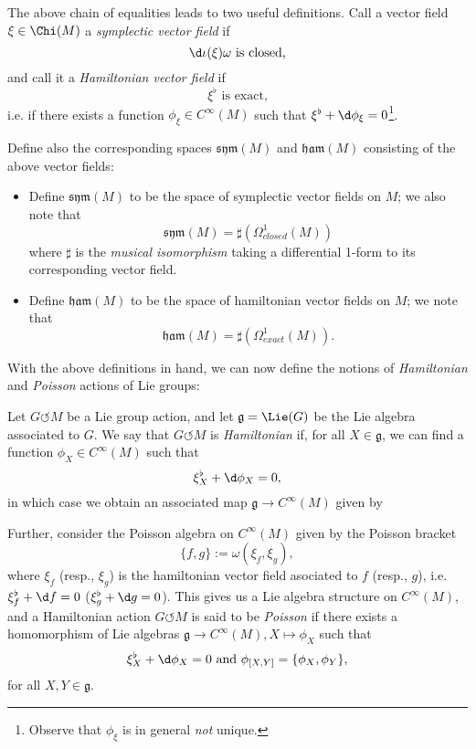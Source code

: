 The above chain of equalities leads to two useful definitions. Call a vector field $\xi \in \Chi(M)$ a \emph{symplectic vector field} if
$$
\d \iota(\xi)\omega \mbox{ is closed,}
$$
and call it a \emph{Hamiltonian vector field} if
$$
\xi^\flat \mbox{ is exact,}
$$
i.e. if there exists a function $\phi_\xi \in C^\infty(M)$ such that $\xi^\flat + \d \phi_\xi = 0$\footnote{Observe that $\phi_\xi$ is in general \emph{not} unique.}.

Define also the corresponding spaces $\mathfrak{sym}(M)$ and $\mathfrak{ham}(M)$ consisting of the above vector fields:
\begin{itemize}
\item Define $\mathfrak{sym}(M)$ to be the space of symplectic vector fields on $M$; we also note that
$$
\mathfrak{sym}(M) = \sharp(\Omega^1_{closed}(M))
$$
where $\sharp$ is the \emph{musical isomorphism} taking a differential 1-form to its corresponding vector field.

\item Define $\mathfrak{ham}(M)$ to be the space of hamiltonian vector fields on $M$; we note that
$$
\mathfrak{ham}(M) = \sharp(\Omega^1_{exact}(M)).
$$
 \end{itemize}

With the above definitions in hand, we can now define the notions of \emph{Hamiltonian} and \emph{Poisson} actions of Lie groups:
\begin{defn}
Let $G \circlearrowleft M$ be a Lie group action, and let $\mathfrak{g} = \Lie(G)$ be the Lie algebra associated to $G$. We say that $G \circlearrowleft M$ is \emph{Hamiltonian} if, for all $X \in \mathfrak{g}$, we can find a function $\phi_X \in C^\infty(M)$  such that
$$
\xi^\flat_X + \d \phi_X = 0,
$$
in which case we obtain an associated map $\mathfrak{g} \to C^\infty(M)$ given by %

Further, consider the Poisson algebra on $C^\infty(M)$ given by the Poisson bracket
$$
\{f,g\} := \omega(\xi_f, \xi_g),
$$
where $\xi_f$ (resp., $\xi_g$) is the hamiltonian vector field asociated to $f$ (resp., $g$), i.e. $\xi^\flat_f + \d f = 0$ ($\xi^\flat_g + \d g = 0$). This gives us a Lie algebra structure on $C^\infty(M)$, and a Hamiltonian action $G \circlearrowleft M$ is said to be \emph{Poisson} if there exists a homomorphism of Lie algebras $\mathfrak{g} \to C^\infty(M), X \mapsto \phi_X$ such that
$$
\xi^\flat_X + \d \phi_X = 0 \mbox{ and } \phi_{[X,Y]} = \{\phi_X, \phi_Y\},
$$
for all $X,Y \in \mathfrak{g}$.
\end{defn}

